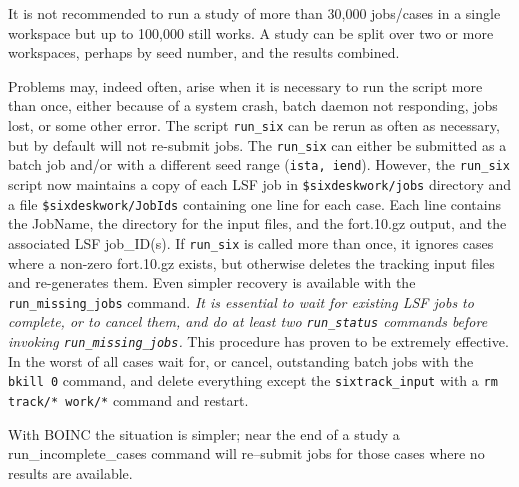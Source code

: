 \documentclass{cernatsnote}    %
\begin{document}
It is not recommended to run a study of more than 30,000 jobs/cases in a
single workspace but up to 100,000 still works. A study can be split 
over two or more workspaces, perhaps by seed number, and the results combined.

Problems may, indeed often, arise when it is necessary to run the script more than once,
either because of a system crash, batch daemon not responding, jobs lost, or some other error.
The script {\tt run\_six} can be rerun as often as necessary, but by default will not re-submit
jobs. The {\tt run\_six} can either be submitted as a batch job and/or with a different seed range
({\tt ista, iend}). 
However, the {\tt run\_six} script now maintains a copy of each LSF job in {\tt \$sixdeskwork/jobs}
directory and a file {\tt \$sixdeskwork/JobIds} containing one line for each case. Each line
contains the JobName, the directory for the input files, and the fort.10.gz output, and the
associated LSF job\_ID(s). If {\tt run\_six} is called more than once, it ignores cases
where a non-zero fort.10.gz exists, but otherwise deletes the tracking input files and 
re-generates them. Even simpler recovery is available with the 
{\tt run\_missing\_jobs} command.
\emph{It is essential to wait for existing LSF jobs to complete, or to cancel them, 
and do at least two {\tt run\_status} commands before invoking {\tt run\_missing\_jobs}.}
This procedure has proven to be extremely effective.
In the worst of all cases wait for, or cancel, outstanding batch jobs 
with the {\tt bkill 0} command, 
and delete everything except the {\tt sixtrack\_input}  with a
{\tt rm track/* work/*} command and restart.  

With BOINC the situation is simpler; near the end of a study a {run\_incomplete\_cases}
command will re--submit jobs for those cases where no results are available.
\end{document}
